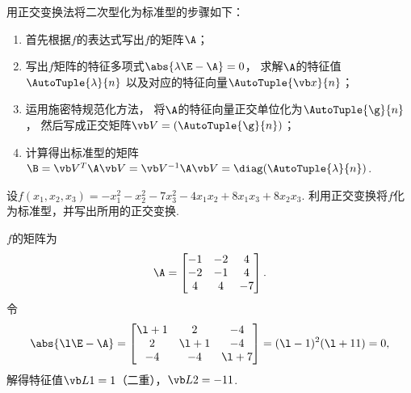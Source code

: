 \begingroup
\color{red}
用正交变换法将二次型化为标准型的步骤如下：
\begin{enumerate}
	\item 首先根据\(f\)的表达式写出\(f\)的矩阵\(\A\)；
	\item 写出\(f\)矩阵的特征多项式\(\abs{\lambda\E-\A}=0\)，
	求解\(\A\)的特征值\(\AutoTuple{\lambda}{n}\)
	以及对应的特征向量\(\AutoTuple{\x}{n}\)；
	\item 运用施密特规范化方法，
	将\(\A\)的特征向量正交单位化为\(\AutoTuple{\g}{n}\)，
	然后写成正交矩阵\(\Q=(\AutoTuple{\g}{n})\)；
	\item 计算得出标准型的矩阵
	\(\B=\Q^T\A\Q=\Q^{-1}\A\Q=\diag(\AutoTuple{\lambda}{n})\).
\end{enumerate}
\endgroup

\begin{example}
设\(f(x_1,x_2,x_3) = -x_1^2-x_2^2-7x_3^2-4x_1x_2+8x_1x_3+8x_2x_3\).
利用正交变换将\(f\)化为标准型，并写出所用的正交变换.
\begin{solution}
\(f\)的矩阵为\[
	\A = \begin{bmatrix}
		-1 & -2 & 4 \\
		-2 & -1 & 4 \\
		4 & 4 & -7
	\end{bmatrix}.
\]
令\[
	\abs{\l\E-\A}
	= \begin{bmatrix}
		\l+1 & 2 & -4 \\
		2 & \l+1 & -4 \\
		-4 & -4 & \l+7
	\end{bmatrix}
	= (\l-1)^2 (\l+11)
	= 0,
\]
解得特征值\(\L1=1\)（二重），\(\L2=-11\).


\end{solution}
\end{example}
